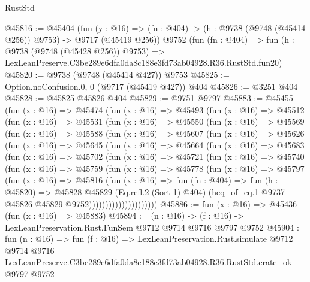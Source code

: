 \begin{lexlean}{RustStd}
\begin{coremodule}
@45816 := @45404
    (fun (y : @16) => (fn : @404) -> (h : @9738 (@9748 (@45414 @256)) @9753) -> @9717 (@45419 @256))
    @9752
    (fun (fn : @404) =>
    fun (h : @9738 (@9748 (@45428 @256)) @9753) =>
    LexLeanPreserve.C3be289e6dfa0da8c188e3fd73ab04928.R36.RustStd.fun20)
@45820 := @9738 (@9748 (@45414 @427)) @9753
@45825 := Option.noConfusion.{0, 0} (@9717 (@45419 @427)) @404
@45826 := @3251 @404
@45828 := @45825 @45826 @404
@45829 := @9751 @9797
@45883 := @45455
    (fun (x : @16) =>
    @45474
      (fun (x : @16) =>
      @45493
        (fun (x : @16) =>
        @45512
          (fun (x : @16) =>
          @45531
            (fun (x : @16) =>
            @45550
              (fun (x : @16) =>
              @45569
                (fun (x : @16) =>
                @45588
                  (fun (x : @16) =>
                  @45607
                    (fun (x : @16) =>
                    @45626
                      (fun (x : @16) =>
                      @45645
                        (fun (x : @16) =>
                        @45664
                          (fun (x : @16) =>
                          @45683
                            (fun (x : @16) =>
                            @45702
                              (fun (x : @16) =>
                              @45721
                                (fun (x : @16) =>
                                @45740
                                  (fun (x : @16) =>
                                  @45759
                                    (fun (x : @16) =>
                                    @45778
                                      (fun (x : @16) =>
                                      @45797
                                        (fun (x : @16) =>
                                        @45816
                                          (fun (x : @16) =>
                                          fun (fn : @404) =>
                                          fun (h : @45820) =>
                                          @45828
                                            @45829
                                            (Eq.refl.{2} (Sort 1) @404)
                                            (heq_of_eq.{1}
                                              @9737
                                              @45826
                                              @45829
                                              @9752)))))))))))))))))))))
@45886 := fun (x : @16) => @45436 (fun (x : @16) => @45883)
@45894 := (n : @16) -> (f : @16) -> LexLeanPreservation.Rust.FunSem @9712 @9714 @9716 @9797 @9752
@45904 := fun (n : @16) =>
  fun (f : @16) =>
  LexLeanPreservation.Rust.simulate
    @9712
    @9714
    @9716
    LexLeanPreserve.C3be289e6dfa0da8c188e3fd73ab04928.R36.RustStd.crate_ok
    @9797
    @9752
\end{coremodule}
\end{lexlean}
